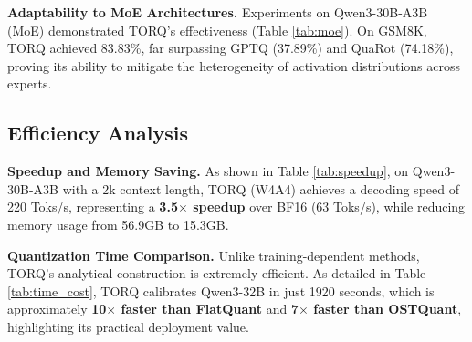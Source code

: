 

\textbf{Adaptability to MoE Architectures.} Experiments on Qwen3-30B-A3B (MoE) demonstrated TORQ's effectiveness (Table \ref{tab:moe}). On GSM8K, TORQ achieved 83.83\%, far surpassing GPTQ (37.89\%) and QuaRot (74.18\%), proving its ability to mitigate the heterogeneity of activation distributions across experts.



\subsection{Efficiency Analysis}

\textbf{Speedup and Memory Saving.} As shown in Table \ref{tab:speedup}, on Qwen3-30B-A3B with a 2k context length, TORQ (W4A4) achieves a decoding speed of 220 Toks/s, representing a \textbf{3.5$\times$ speedup} over BF16 (63 Toks/s), while reducing memory usage from 56.9GB to 15.3GB.



\textbf{Quantization Time Comparison.} Unlike training-dependent methods, TORQ's analytical construction is extremely efficient. As detailed in Table \ref{tab:time_cost}, TORQ calibrates Qwen3-32B in just 1920 seconds, which is approximately \textbf{10$\times$ faster than FlatQuant} and \textbf{7$\times$ faster than OSTQuant}, highlighting its practical deployment value.



